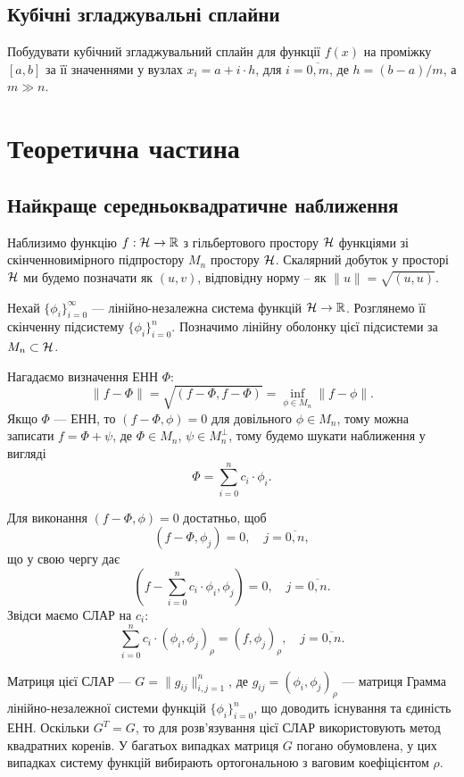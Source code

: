 \subsection{Кубічні згладжувальні сплайни}

Побудувати кубічний згладжувальний  сплайн для функції $f(x)$ на проміжку $[a, b]$ за її значеннями у вузлах $x_i = a + i \cdot h$, для $i = \overline{0, m}$, де $h = (b - a) / m$, а $m \gg n$.

\section{Теоретична частина}

\subsection{Найкраще середньоквадратичне наближення}

Наблизимо функцію $f: \mathcal{H} \to \mathbb{R}$ з гільбертового простору $\mathcal{H}$ функціями зі скінченновимірного підпростору $M_n$ простору $\mathcal{H}$. Скалярний добуток у просторі $\mathcal{H}$ ми будемо позначати як $(u, v)$, відповідну норму -- як $\|u\| = \sqrt{(u, u)}$. \medskip

Нехай $\{\phi_i\}_{i=0}^\infty$ --- лінійно-незалежна система функцій $\mathcal{H} \to \mathbb{R}$. Розглянемо її скінченну підсистему $\{\phi_i\}_{i=0}^n$. Позначимо лінійну оболонку цієї підсистеми за $M_n \subset \mathcal{H}$. \medskip

Нагадаємо визначення ЕНН $\Phi$: \[ \|f - \Phi\| = \sqrt{(f - \Phi, f - \Phi)} = \inf_{\phi \in M_n} \|f - \phi\|. \] Якщо $\Phi$ --- ЕНН, то $(f - \Phi, \phi) = 0$ для довільного $\phi \in M_n$, тому можна записати $f = \Phi + \psi$, де $\Phi \in M_n$, $\psi \in M_n^\perp$, тому будемо шукати наближення у вигляді \[ \Phi = \sum_{i = 0}^n c_i \cdot \phi_i. \]

Для виконання $(f - \Phi, \phi) = 0$ достатньо, щоб \[ (f - \Phi, \phi_j) = 0, \quad j = \overline{0, n}, \] що у свою чергу дає \[ \left(f - \sum_{i = 0}^n c_i \cdot \phi_i, \phi_j \right) = 0, \quad j = \overline{0, n}. \] Звідси маємо СЛАР на $c_i$: \[ \sum_{i=0}^n c_i \cdot (\phi_i, \phi_j)_\rho = (f, \phi_j)_\rho, \quad j = \overline{0, n}. \]

Матриця цієї СЛАР --- $G = \|g_{ij}\|_{i,j=1}^{n}$, де $g_{ij} = (\phi_i, \phi_j)_\rho$ --- матриця Грамма лінійно-незалежної системи функцій $\{\phi_i\}_{i=0}^n$, що доводить існування та єдиність ЕНН. Оскільки $G^T = G$, то для роз\-в'яз\-у\-ва\-ння цієї СЛАР використовують метод квадратних коренів. У багатьох випадках матриця $G$ погано обумовлена, у цих випадках систему функцій вибирають ортогональною з ваговим коефіцієнтом $\rho$. \medskip

